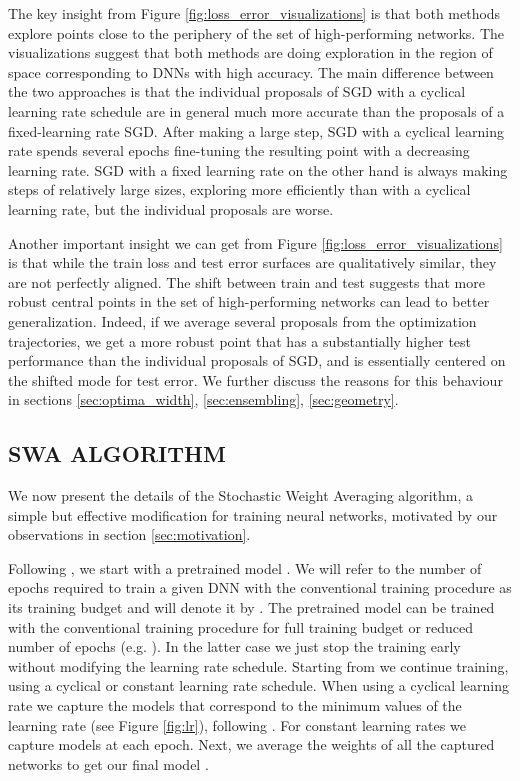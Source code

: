 \documentclass[letterpaper]{article}
\begin{document}
The key insight from Figure \ref{fig:loss_error_visualizations} is that both
methods explore points close to the periphery of the set of high-performing
networks.
The visualizations suggest that both methods are doing exploration in the
region of space corresponding to DNNs with high accuracy. The main difference
between the two approaches is that the individual proposals of SGD with a 
cyclical learning rate schedule are in general much more accurate than the proposals
of a fixed-learning rate SGD.  After making a large step,
SGD with a cyclical learning rate spends several epochs fine-tuning the 
resulting point with a decreasing learning rate. SGD with a fixed learning rate on the other hand is always
making steps of relatively large sizes, exploring more efficiently than with 
a cyclical learning rate, but the individual proposals are worse.

Another important insight we can get from Figure \ref{fig:loss_error_visualizations}
is that while the train loss and test error surfaces are qualitatively similar,
they are not perfectly aligned. The shift between train and test suggests that
more robust central points in the set of high-performing networks
can lead to better generalization.
Indeed, if we average several proposals from the optimization trajectories, we get
a more robust point that has a substantially higher test performance than the 
individual proposals of SGD, and is essentially centered on the shifted mode for
test error. We further discuss the reasons
for this behaviour in sections \ref{sec:optima_width}, \ref{sec:ensembling},
\ref{sec:geometry}. 

\raggedbottom

\subsection{SWA ALGORITHM}
\label{sec:method}

We now present the details of the Stochastic Weight Averaging algorithm, 
a simple but effective modification for training neural networks, motivated by
our observations in section \ref{sec:motivation}.

Following \citet{garipov2018}, we start with a pretrained model . 
We will refer to the number of epochs required to train a given DNN
with the conventional training procedure as its training budget and will
denote it by .
The pretrained model  can be trained with the conventional training 
procedure for full training budget or reduced number of epochs (e.g. ).
In the latter case we just stop the training early without modifying the 
learning rate schedule.
Starting from  we continue
training, using a cyclical or constant learning rate schedule. 
When using a cyclical learning rate we capture the 
models  that correspond to the minimum values of the learning rate 
(see Figure \ref{fig:lr}), following \citet{garipov2018}. For constant 
learning rates we capture models at each epoch.
Next, we average the weights of all the captured networks 
to get our final model . 
\end{document}
